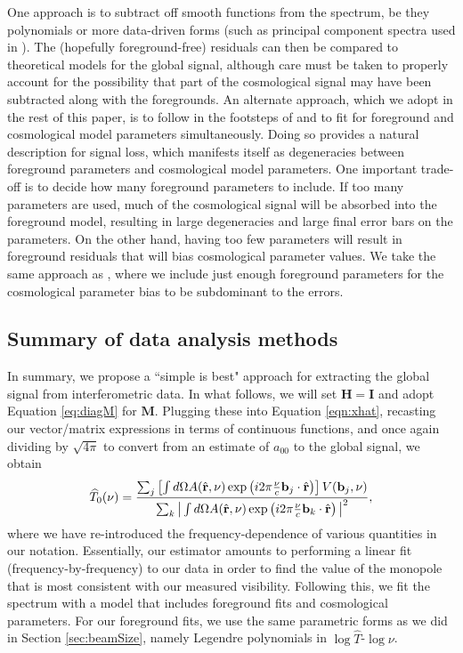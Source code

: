 \documentclass[twocolumn,apj,numberedappendix]{emulateapj}
\newcommand{\Hmat}{\mathbf{H}}
\newcommand{\M}{\mathbf{M}}
\newcommand{\rhat}{\hat{\mathbf{r}}}
\begin{document}
One approach is to subtract off smooth functions from the spectrum, be they polynomials or more data-driven forms (such as principal component spectra used in \citealt{Liu_Switzer_2014}). The (hopefully foreground-free) residuals can then be compared to theoretical models for the global signal, although care must be taken to properly account for the possibility that part of the cosmological signal may have been subtracted along with the foregrounds. An alternate approach, which we adopt in the rest of this paper, is to follow in the footsteps of \citet{PritchardLoeb2010,DAREMCMC,BernardiLEDA} and to fit for foreground and cosmological model parameters simultaneously. Doing so provides a natural description for signal loss, which manifests itself as degeneracies between foreground parameters and cosmological model parameters. One important trade-off is to decide how many foreground parameters to include. If too many parameters are used, much of the cosmological signal will be absorbed into the foreground model, resulting in large degeneracies and large final error bars on the parameters. On the other hand, having too few parameters will result in foreground residuals that will bias cosmological parameter values. We take the same approach as \citet{BernardiLEDA}, where we include just enough foreground parameters for the cosmological parameter bias to be subdominant to the errors.

\subsection{Summary of data analysis methods}

In summary, we propose a ``simple is best" approach for extracting the global signal from interferometric data. In what follows, we will set $\Hmat = \mathbf{I}$ and adopt Equation \eqref{eq:diagM} for $\M$. Plugging these into Equation \eqref{eqn:xhat}, recasting our vector/matrix expressions in terms of continuous functions, and once again dividing by $\sqrt{4 \pi}$ to convert from an estimate of $a_{00}$ to the global signal, we obtain
\begin{equation}
\label{eq:IntegralEstInterferometer}
\widehat{T}_0 (\nu)= \frac{\sum_j \left[ \int d\Omega A(\rhat, \nu) \exp\left( i 2 \pi \frac{\nu }{c} \mathbf{b}_j \cdot \rhat \right)\right] V(\mathbf{b}_j, \nu)}{\sum_k \big{|} \int d\Omega A(\rhat, \nu) \exp\left( i 2 \pi \frac{\nu }{c} \mathbf{b}_k \cdot \rhat \right) \big{|}^2},
\end{equation}
where we have re-introduced the frequency-dependence of various quantities in our notation. Essentially, our estimator amounts to performing a linear fit (frequency-by-frequency) to our data in order to find the value of the monopole that is most consistent with our measured visibility. Following this, we fit the spectrum with a model that includes foreground fits and cosmological parameters. For our foreground fits, we use the same parametric forms as we did in Section \ref{sec:beamSize}, namely Legendre polynomials in $\log \widehat{T}$-$\log \nu$.
\end{document}
